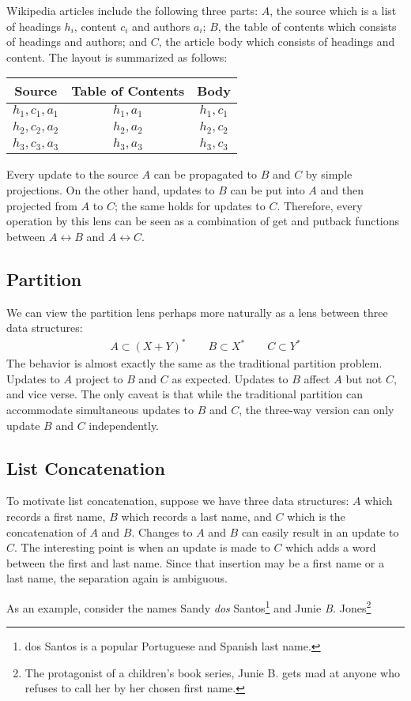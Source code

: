 \documentclass{article}
\begin{document}
Wikipedia articles include the following three parts: $A$, the source which is
a list of headings $h_i$, content $c_i$ and authors $a_i$; $B$, the table of
contents which consists of headings and authors; and $C$, the article body
which consists of headings and content. The layout is summarized as follows:
\begin{center} \begin{tabular}{c c c}
    Source & Table of Contents & Body \\
    \hline
    $h_1,c_1,a_1$ & $h_1,a_1$ & $h_1,c_1$ \\
    $h_2,c_2,a_2$ & $h_2,a_2$ & $h_2,c_2$ \\
    $h_3,c_3,a_3$ & $h_3,a_3$ & $h_3,c_3$ 
\end{tabular} \end{center}
Every update to the source $A$ can be propagated to $B$ and $C$ by
simple projections. On the other hand, updates to $B$ can be
put into $A$ and then projected from $A$ to $C$; the same holds
for updates to $C$. Therefore, every operation by this lens
can be seen as a combination of get and putback functions 
between $A \leftrightarrow B$ and $A \leftrightarrow C$. 

\subsection{Partition}

We can view the partition lens perhaps more naturally as a lens
between three data structures: 
\begin{align*}
  A \subset (X + Y)^\ast \qquad B \subset X^\ast \qquad C \subset Y^\ast
\end{align*}
The behavior is almost exactly the same as the traditional partition
problem. Updates to $A$ project to $B$ and $C$ as expected. Updates to
$B$ affect $A$ but not $C$, and vice verse. The only caveat is
that while the traditional partition can accommodate simultaneous
updates to $B$ and $C$, the three-way version can only update
$B$ and $C$ independently. 

\subsection{List Concatenation} 

To motivate list concatenation, suppose we have three data structures:
$A$ which records a first name, $B$ which records a last name, and
$C$ which is the concatenation of $A$ and $B$. Changes to $A$ and $B$
can easily result in an update to $C$. The interesting point is when
an update is made to $C$ which adds a word between the first and
last name. Since that insertion may be a first name or a last name,
the separation again is ambiguous. 

As an example, consider the names Sandy \emph{dos} Santos\footnote{dos Santos
is a popular Portuguese and Spanish last name.}
and Junie \emph{B.} Jones\footnote{The protagonist of a children's
book series, Junie B. gets mad at anyone who refuses to call her by her chosen
first name.}
\end{document}
